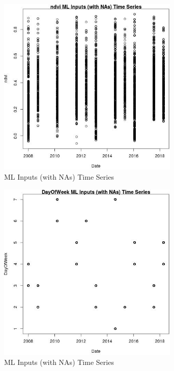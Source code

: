 \begin{figure} 
\centering  
\includegraphics[width=0.77\textwidth]{Code_Outputs/Report_ML_input_PM25_Step4_part_e_de_duplicated_aves_compiled_2019-05-18wNAs_ndvivDate.jpg} 
\caption{\label{fig:Report_ML_input_PM25_Step4_part_e_de_duplicated_aves_compiled_2019-05-18wNAsndvivDate}ML Inputs (with NAs) Time Series} 
\end{figure} 
 

\clearpage 

\begin{figure} 
\centering  
\includegraphics[width=0.77\textwidth]{Code_Outputs/Report_ML_input_PM25_Step4_part_e_de_duplicated_aves_compiled_2019-05-18wNAs_DayOfWeekvDate.jpg} 
\caption{\label{fig:Report_ML_input_PM25_Step4_part_e_de_duplicated_aves_compiled_2019-05-18wNAsDayOfWeekvDate}ML Inputs (with NAs) Time Series} 
\end{figure} 
 


